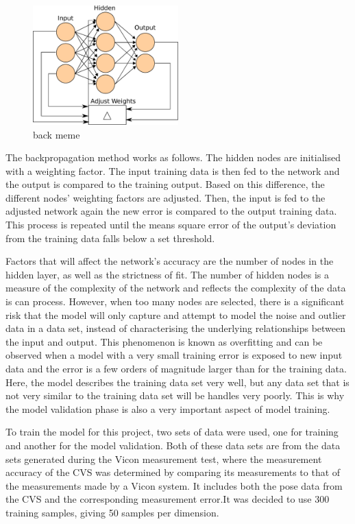 \begin{figure}
  \centering
  \includegraphics[width=0.5\textwidth]{figures/chapter4/backpropagation}
  \caption{back meme}
\label{fig:chap4-backprogagation}
\end{figure}

The backpropagation method works as follows. The hidden nodes are initialised with a weighting factor. The input training data is then fed to the network and the output is compared to the training output. Based on this difference, the different nodes' weighting factors are adjusted. Then, the input is fed to the adjusted network again the new error is compared to the output training data. This process is repeated until the means square error of the output's deviation from the training data falls below a set threshold. 

Factors that will affect the network's accuracy are the number of nodes in the hidden layer, as well as the strictness of fit. The number of hidden nodes is a measure of the complexity of the network and reflects the complexity of the data is can process. However, when too many nodes are selected, there is a significant risk that the model will only capture and attempt to model the noise and outlier data in a data set, instead of characterising the underlying relationships between the input and output. This phenomenon is known as overfitting and can be observed when a model with a very small training error is exposed to new input data and the error is a few orders of magnitude larger than for the training data. Here, the model describes the training data set very well, but any data set that is not very similar to the training data set will be handles very poorly. This is why the model validation phase is also a very important aspect of model training. 

To train the model for this project, two sets of data were used, one for training and another for the model validation. Both of these data sets are from the data sets generated during the Vicon measurement test, where the measurement accuracy of the CVS was determined by comparing its measurements to that of the measurements made by a Vicon system. It includes both the pose data from the CVS and the corresponding measurement error.It was decided to use 300 training samples, giving 50 samples per dimension. 

